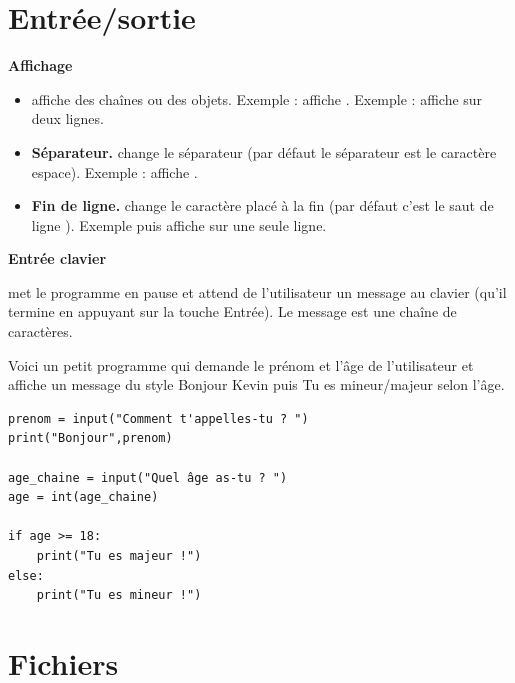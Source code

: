 \documentclass[11pt,class=report,crop=false]{standalone}
\begin{document}
\section{Entrée/sortie}

\textbf{Affichage}

\begin{itemize}
  \item {} \quad affiche des chaînes ou des objets.
 Exemple :  affiche .
 Exemple :  affiche sur deux lignes.
 
  \item \textbf{Séparateur.}  \quad change le séparateur (par défaut le séparateur est le caractère espace). Exemple :  affiche
  .
  
   \item \textbf{Fin de ligne.}  \quad change le caractère placé à la fin (par défaut c'est le saut de ligne \ci{\\n}).
   Exemple  puis  affiche  sur une seule ligne.
   
\end{itemize}

\bigskip

\textbf{Entrée clavier}

 \quad  met le programme en pause et attend de l'utilisateur un message au clavier (qu'il termine en appuyant sur la touche \og{}Entrée\fg{}). Le message est une chaîne de caractères.

Voici un petit programme qui demande le prénom et l'âge de l'utilisateur et affiche un message du style 
\og{}Bonjour Kevin\fg{} puis \og{}Tu es mineur/majeur\fg{} selon l'âge. 
\begin{lstlisting}
prenom = input("Comment t'appelles-tu ? ")
print("Bonjour",prenom)

age_chaine = input("Quel âge as-tu ? ")
age = int(age_chaine)

if age >= 18:
    print("Tu es majeur !")
else:
    print("Tu es mineur !")
\end{lstlisting}  




\section{Fichiers}
\end{document}

